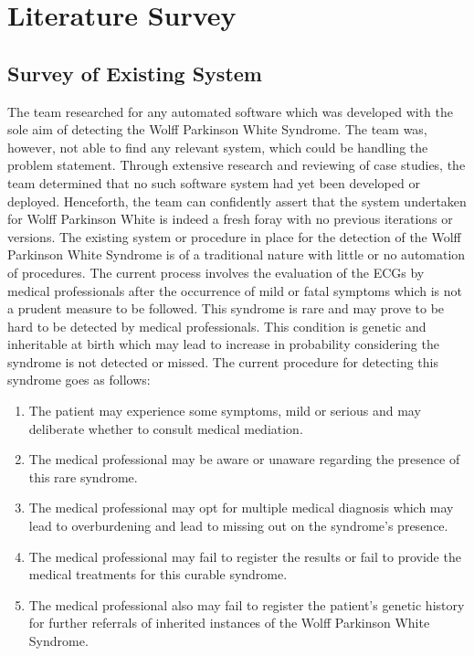 \chapter{Literature Survey}
\section*{Survey of Existing System}
The team researched for any automated software which was developed with the sole aim of detecting the Wolff Parkinson White Syndrome. The team was, however, not able to find any relevant system, which could be handling the problem statement. Through extensive research and reviewing of case studies, the team determined that no such software system had yet been developed or deployed. Henceforth, the team can confidently assert that the system undertaken for Wolff Parkinson White is indeed a fresh foray with no previous iterations or versions. The existing system or procedure in place for the detection of the Wolff Parkinson White Syndrome is of a traditional nature with little or no automation of procedures. The current process involves the evaluation of the ECGs by medical professionals after the occurrence of mild or fatal symptoms which is not a prudent measure to be followed. This syndrome is rare and may prove to be hard to be detected by medical professionals. This condition is genetic and inheritable at birth which may lead to increase in probability considering the syndrome is not detected or missed. The current procedure for detecting this syndrome goes as follows: 

\begin{enumerate}
	\item The patient may experience some symptoms, mild or serious and may deliberate whether to consult medical mediation. 
	\item The medical professional may be aware or unaware regarding the presence of this rare syndrome. 
	\item The medical professional may opt for multiple medical diagnosis which may lead to overburdening and lead to missing out on the syndrome's presence.
	\item The medical professional may fail to register the results or fail to provide the medical treatments for this curable syndrome. 
	\item The medical professional also may fail to register the patient's genetic history for further referrals of inherited instances of the Wolff Parkinson White Syndrome.  
\end{enumerate}

